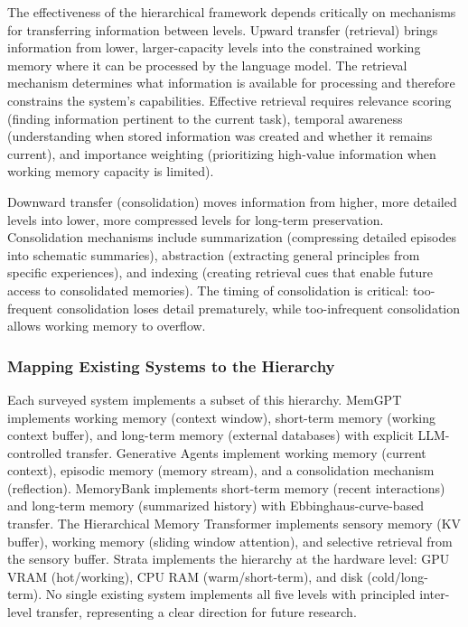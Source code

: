 \documentclass[11pt,letterpaper]{article}
\begin{document}
The effectiveness of the hierarchical framework depends critically on mechanisms for transferring information between levels. Upward transfer (retrieval) brings information from lower, larger-capacity levels into the constrained working memory where it can be processed by the language model. The retrieval mechanism determines what information is available for processing and therefore constrains the system's capabilities. Effective retrieval requires relevance scoring (finding information pertinent to the current task), temporal awareness (understanding when stored information was created and whether it remains current), and importance weighting (prioritizing high-value information when working memory capacity is limited).

Downward transfer (consolidation) moves information from higher, more detailed levels into lower, more compressed levels for long-term preservation. Consolidation mechanisms include summarization (compressing detailed episodes into schematic summaries), abstraction (extracting general principles from specific experiences), and indexing (creating retrieval cues that enable future access to consolidated memories). The timing of consolidation is critical: too-frequent consolidation loses detail prematurely, while too-infrequent consolidation allows working memory to overflow.

\subsubsection{Mapping Existing Systems to the Hierarchy}

Each surveyed system implements a subset of this hierarchy. MemGPT implements working memory (context window), short-term memory (working context buffer), and long-term memory (external databases) with explicit LLM-controlled transfer. Generative Agents implement working memory (current context), episodic memory (memory stream), and a consolidation mechanism (reflection). MemoryBank implements short-term memory (recent interactions) and long-term memory (summarized history) with Ebbinghaus-curve-based transfer. The Hierarchical Memory Transformer implements sensory memory (KV buffer), working memory (sliding window attention), and selective retrieval from the sensory buffer. Strata implements the hierarchy at the hardware level: GPU VRAM (hot/working), CPU RAM (warm/short-term), and disk (cold/long-term). No single existing system implements all five levels with principled inter-level transfer, representing a clear direction for future research.
\end{document}
